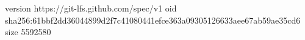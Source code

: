 version https://git-lfs.github.com/spec/v1
oid sha256:61bbf2dd36044899d2f7c41080441efce363a09305126633aee67ab59ae35cd6
size 5592580
